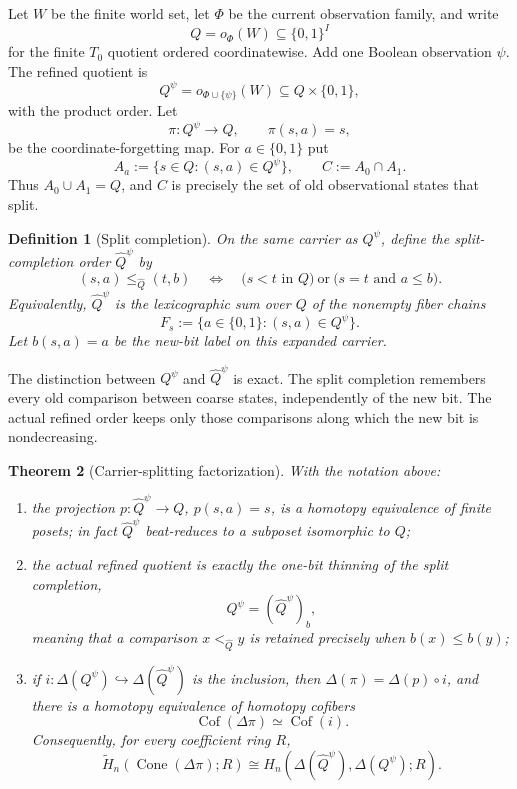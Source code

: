 \documentclass[11pt]{article}
\newtheorem{theorem}{Theorem}[section]
\newtheorem{definition}[theorem]{Definition}
\newcommand{\Cone}{\operatorname{Cone}}
\begin{document}
Let $W$ be the finite world set, let $\Phi$ be the current observation family,
and write
\[
 Q=o_\Phi(W)\subseteq\{0,1\}^{I}
\]
for the finite $T_0$ quotient ordered coordinatewise.  Add one Boolean
observation $\psi$.  The refined quotient is
\[
 Q^\psi=o_{\Phi\cup\{\psi\}}(W)
 \subseteq Q\times\{0,1\},
\]
with the product order.  Let
\[
 \pi:Q^\psi\longrightarrow Q,
 \qquad \pi(s,a)=s,
\]
be the coordinate-forgetting map.  For $a\in\{0,1\}$ put
\[
 A_a:=\{s\in Q:(s,a)\in Q^\psi\},
 \qquad C:=A_0\cap A_1.
\]
Thus $A_0\cup A_1=Q$, and $C$ is precisely the set of old observational
states that split.

\begin{definition}[Split completion]
On the same carrier as $Q^\psi$, define the split-completion order
$\widehat Q^\psi$ by
\[
 (s,a)\leq_{\widehat Q}(t,b)
 \quad\Longleftrightarrow\quad
 \bigl(s<t\text{ in }Q\bigr)
 \ \text{or}\ 
 \bigl(s=t\text{ and }a\leq b\bigr).
\]
Equivalently, $\widehat Q^\psi$ is the lexicographic sum over $Q$ of the
nonempty fiber chains
\[
 F_s:=\{a\in\{0,1\}:(s,a)\in Q^\psi\}.
\]
Let $b(s,a)=a$ be the new-bit label on this expanded carrier.
\end{definition}

The distinction between $Q^\psi$ and $\widehat Q^\psi$ is exact.  The split
completion remembers every old comparison between coarse states, independently
of the new bit.  The actual refined order keeps only those comparisons along
which the new bit is nondecreasing.

\begin{theorem}[Carrier-splitting factorization]\label{thm:split-factorization}
With the notation above:
\begin{enumerate}[label=(\roman*)]
\item the projection $p:\widehat Q^\psi\to Q$, $p(s,a)=s$, is a homotopy
  equivalence of finite posets; in fact $\widehat Q^\psi$ beat-reduces to a
  subposet isomorphic to $Q$;
\item the actual refined quotient is exactly the one-bit thinning of the split
  completion,
  \[
    Q^\psi=(\widehat Q^\psi)_b,
  \]
  meaning that a comparison $x<_{\widehat Q}y$ is retained precisely when
  $b(x)\leq b(y)$;
\item if $i:\Delta(Q^\psi)\hookrightarrow\Delta(\widehat Q^\psi)$ is the
  inclusion, then $\Delta(\pi)=\Delta(p)\circ i$, and there is a homotopy
  equivalence of homotopy cofibers
  \[
  \operatorname{Cof}(\Delta\pi)\simeq
  \operatorname{Cof}(i).
  \]
  Consequently, for every coefficient ring $R$,
  \[
  \widetilde H_n\!\left(\Cone(\Delta\pi);R\right)
  \cong
  H_n\!\left(\Delta(\widehat Q^\psi),\Delta(Q^\psi);R\right).
  \]
\end{enumerate}
\end{theorem}
\end{document}
